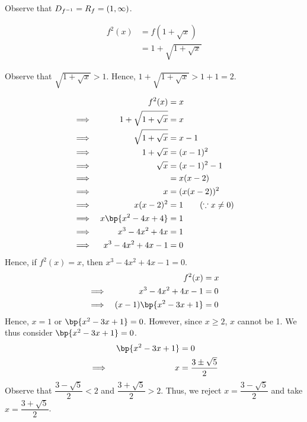 \documentclass{echw}
\begin{document}

                Observe that $D_{f^{-1}} = R_{f} = (1, \infty)$.


            \subpart
                \begin{align*}
                    f^2(x) &= f(1+\sqrt{x})\\
                    &= 1 + \sqrt{1 + \sqrt{x}}
                \end{align*}


                Observe that $\sqrt{1 + \sqrt{x}} > 1$. Hence, $1 + \sqrt{1 + \sqrt{x}} > 1 + 1 = 2$.


            \subpart
                \begin{alignat*}{2}
                    &&f^2(x) &= x\\
                    \implies&& 1 + \sqrt{1 + \sqrt{x}} &= x\\
                    \implies&& \sqrt{1 + \sqrt{x}} &= x - 1\\
                    \implies&& 1 + \sqrt{x} &= (x - 1)^2\\
                    \implies&& \sqrt{x} &= (x - 1)^2 - 1\\
                    \implies&& &= x(x-2)\\
                    \implies&& x &= (x(x-2))^2\\
                    \implies&& x(x-2)^2 &= 1 \qquad (\because x \neq 0)\\
                    \implies&& x\bp{x^2 -4x + 4 } &= 1 \\
                    \implies&& x^3 -4x^2 + 4x  &= 1 \\
                    \implies&& x^3 -4x^2 + 4x -1 &= 0
                \end{alignat*}
                Hence, if $f^2(x) = x$, then $x^3 -4x^2 + 4x -1 = 0$.
                \begin{alignat*}{2}
                    &&f^2(x) &= x\\
                    \implies&&x^3 -4x^2 + 4x -1 &= 0 \\
                    \implies&&(x-1)\bp{x^2-3x+1} &= 0
                \end{alignat*}
                Hence, $x = 1$ or $\bp{x^2-3x+1} = 0$. However, since $x \geq 2$, $x$ cannot be 1. We thus consider $\bp{x^2-3x+1} = 0$.
                \begin{alignat*}{2}
                    &&\bp{x^2-3x+1} &= 0\\
                    \implies&&x &= \dfrac{3 \pm \sqrt{5}}{2}
                \end{alignat*}
                Observe that $\dfrac{3 - \sqrt{5}}{2} < 2$ and $\dfrac{3 + \sqrt{5}}{2} > 2$. Thus, we reject $x = \dfrac{3 - \sqrt{5}}{2}$ and take $x = \dfrac{3 + \sqrt{5}}{2}$.
\end{document}
